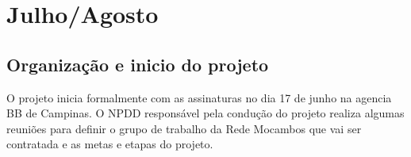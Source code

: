 \documentclass[a4paper, 11pt, oneside]{Relatorio_sem}  %
\begin{document}
%






\mainmatter	  %
\pagestyle{fancy}  %


\part{Julho/Agosto}

\chapter{Organização e inicio do projeto}\lhead{\leftmark}
O projeto inicia formalmente com as assinaturas no dia 17 de junho na
agencia BB de Campinas. O NPDD responsável pela condução do projeto
realiza algumas reuniões para definir o grupo de trabalho da Rede
Mocambos que vai ser contratada e as metas e etapas do projeto.
\end{document}
